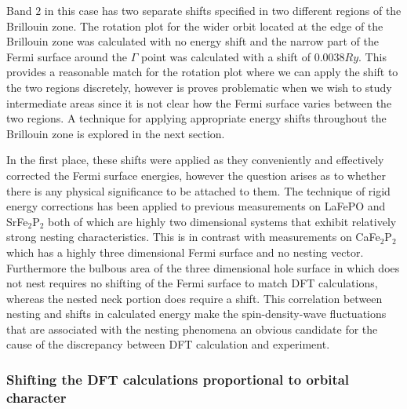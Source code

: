Band $2$ in this case has two separate shifts specified in two different regions of the Brillouin zone. The rotation plot for the wider orbit located at the edge of the Brillouin zone was calculated with no energy shift and the narrow part of the Fermi surface around the $\Gamma$ point was calculated with a shift of $0.0038\unit{Ry}$. This provides a reasonable match for the rotation plot where we can apply the shift to the two regions discretely, however is proves problematic when we wish to study intermediate areas since it is not clear how the Fermi surface varies between the two regions. A technique for applying appropriate energy shifts throughout the Brillouin zone is explored in the next section.

In the first place, these shifts were applied as they conveniently and effectively corrected the Fermi surface energies, however the question arises as to whether there is any physical significance to be attached to them. The technique of rigid energy corrections has been applied to previous measurements on LaFePO\cite{Carrington2009} and SrFe$_2$P$_2$\cite{Analytis2009} both of which are highly two dimensional systems that exhibit relatively strong nesting characteristics. This is in contrast with measurements on CaFe$_2$P$_2$\cite{Coldea2009} which has a highly three dimensional Fermi surface and no nesting vector. Furthermore the bulbous area of the three dimensional hole surface in \BaFeP which does not nest requires no shifting of the Fermi surface to match DFT calculations, whereas the nested neck portion does require a shift. This correlation between nesting and shifts in calculated energy make the spin-density-wave fluctuations that are associated with the nesting phenomena an obvious candidate for the cause of the discrepancy between DFT calculation and experiment.


\subsubsection{Shifting the DFT calculations proportional to orbital character}
\label{Sec:ShiftingDFTPropToOrbitalCharacter}

